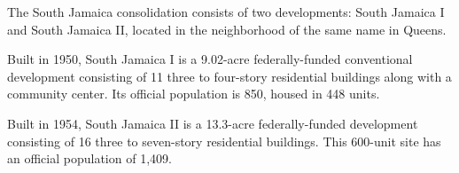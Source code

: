  

The South Jamaica consolidation consists of two developments: South Jamaica I and South Jamaica II, located in the neighborhood of the same name in Queens. 

Built in 1950, South Jamaica I is a 9.02-acre federally-funded conventional development consisting of 11 three to four-story residential buildings along with a community center. Its official population is 850, housed in 448 units. 

Built in 1954, South Jamaica II is a 13.3-acre federally-funded development consisting of 16 three to seven-story residential buildings. This 600-unit site has an official population of 1,409.